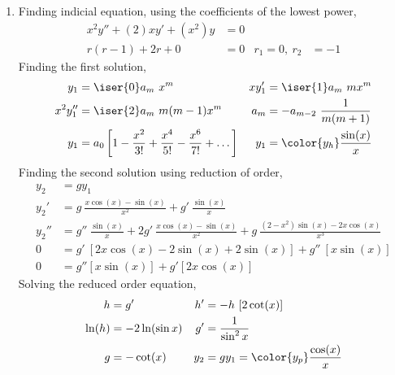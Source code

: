 \begin{enumerate}
    \item Finding indicial equation, using the coefficients of the lowest power,
          \begin{align}
              x^2 y'' + (2)x y' + (x^2) y & = 0    \\
              r(r - 1) + 2r + 0           & = 0  &
              r_1 = 0,\ r_2               & = -1
          \end{align}
          Finding the first solution,
          \begin{align}
              y_1            & = \iser{0} a_{m}\ x^{m}          &
              xy_1'          & = \iser{1} a_{m}\ m x^{m}          \\
              x^2 y_1''      & = \iser{2} a_{m}\ m(m-1) x^{m}   &
              a_m            & = -a_{m-2}\ \frac{1}{m(m+1)}       \\
              y_1            & = a_0\left[ 1 - \frac{x^2}{3!}
                  + \frac{x^4}{5!} - \frac{x^6}{7!}
              + \dots\right] &
              y_1            & = \color{y_h}  \frac{\sin(x)}{x}
          \end{align}
          Finding the second solution using reduction of order,
          \begin{align}
              y_2   & = gy_1                                                          \\
              y_2'  & = g\ \frac{x \cos(x) - \sin(x)}{x^2} + g'\ \frac{\sin(x)}{x}    \\
              y_2'' & = g''\ \frac{\sin(x)}{x} + 2g'\ \frac{x \cos(x) - \sin(x)}{x^2}
              + g\ \frac{(2 - x^2)\sin(x) - 2x\cos(x)}{x^3}                           \\
              0     & = g'\ [ 2x\cos(x) - 2\sin(x) + 2\sin(x)]
              + g''\ [x \sin(x)]                                                      \\
              0     & = g''[x\sin(x)] + g'[2x\cos(x)]
          \end{align}
          Solving the reduced order equation,
          \begin{align}
              h      & = g'                                   &
              h'     & = -h\ [2\cot(x)]                         \\
              \ln(h) & = - 2\ln(\sin x)                       &
              g'     & = \frac{1}{\sin^{2}x}                    \\
              g      & = -\cot(x)                             &
              y_2    & = gy_1 = \color{y_p} \frac{\cos(x)}{x}
          \end{align}


\end{enumerate}
